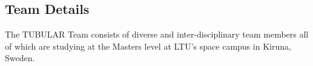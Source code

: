 \subsection{Team Details}
The TUBULAR Team consists of diverse and inter-disciplinary team members all of which are studying at the Masters level at LTU's space campus in Kiruna, Sweden. 

\bigskip

